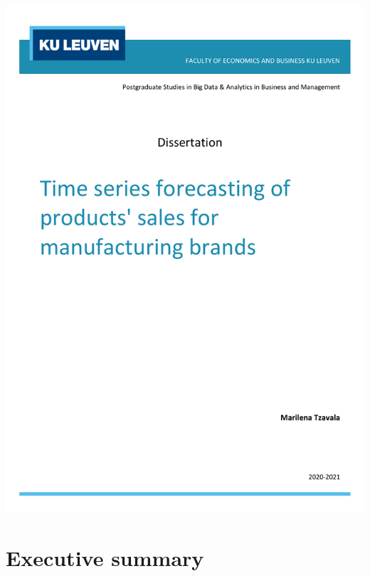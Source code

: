 \documentclass[12pt, letterpaper]{article}\usepackage[]{graphicx}\usepackage[]{color}
\begin{document}
\begin{titlepage}
    \begin{center}
	{\includegraphics[width = \textwidth]{"PG_Dissertation_template_page1.pdf"}} 
            
    \end{center}
\end{titlepage}
\tableofcontents
\newpage
\section*{Executive summary}
\end{document}
